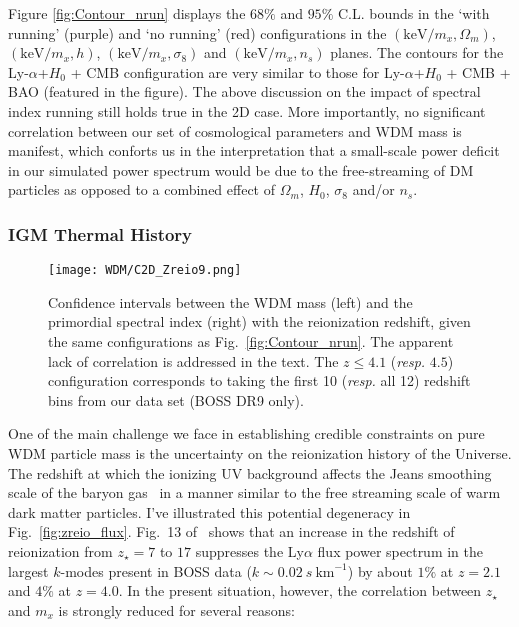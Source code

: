 Figure \ref{fig:Contour_nrun} displays the $68\%$ and $95\%$ C.L. bounds in the `with running' (purple) and `no running' (red) configurations in the $\left( \mathrm{keV}/m_x, \Omega_m \right)$, $\left( \mathrm{keV}/m_x, h \right)$, $\left( \mathrm{keV}/m_x, \sigma_8 \right)$ and $\left( \mathrm{keV}/m_x, n_s \right)$ planes. The contours for the Ly-$\alpha$+$H_0$ + CMB configuration are very similar to those for Ly-$\alpha$+$H_0$ + CMB + BAO (featured in the figure). The above discussion on the impact of spectral index running still holds true in the 2D case. More importantly, no significant correlation between our set of cosmological parameters and WDM mass is manifest, which conforts us in the interpretation that a small-scale power deficit in our simulated power spectrum would be due to the free-streaming of DM particles as opposed to a combined effect of $\Omega_m$, $H_0$, $\sigma_8$ and/or $n_s$. 


\subsubsection{IGM Thermal History}

\begin{figure}
\begin{center}
\texttt{[image: WDM/C2D\_Zreio9.png]}
\caption{ Confidence intervals between the WDM mass (left) and the primordial spectral index (right) with the reionization redshift, given the same configurations as Fig.~\ref{fig:Contour_nrun}. The apparent lack of correlation is addressed in the text. The $z \leq 4.1$ (\textit{resp.} $4.5$) configuration corresponds to taking the first 10 (\textit{resp.} all 12) redshift bins from our data set (BOSS DR9 only).}
\label{fig:Contour_Zreio}
\end{center}
\end{figure}

One of the main challenge we face in establishing credible constraints on pure WDM particle mass is the uncertainty on the reionization history of the Universe. The redshift at which the ionizing UV background affects the Jeans smoothing scale of the baryon gas~\citep{Gnedin&Hui98} in a manner similar to the free streaming scale of warm dark matter particles. I've illustrated  this potential degeneracy in Fig.~\ref{fig:zreio_flux}. Fig.~13 of~\cite{McDonald2005} shows that an increase in the redshift of reionization from $z_{\star}=7$ to $17$ suppresses the Ly$\alpha$ flux power spectrum in the largest $k$-modes present in BOSS data ($k \sim 0.02~ s~\mathrm{km}^{-1}$) by about $1\%$ at $z=2.1$ and $4\%$ at $z=4.0$. In the present situation, however, the correlation between $z_\star$ and $m_x$ is strongly reduced for several reasons: \\

